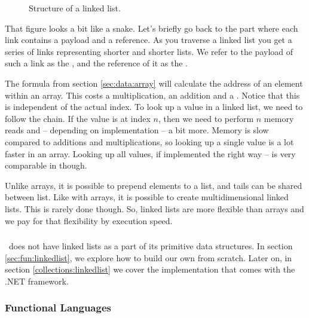\begin{figure}[tbp]
  
  \caption{Structure of a linked list.}
  \label{fig:primdata:linkedlist}
\end{figure}

That figure looks a bit like a snake. Let's briefly go back to the part where each link contains a payload and a reference. As you traverse a linked list you get a series of links representing shorter and shorter lists. We refer to the payload of such a link as the , and the reference of it as the .

The formula from section \ref{sec:data:array} will calculate the address of an element within an array. This costs a multiplication, an addition and a . Notice that this is independent of the actual index. To look up a value in a linked list, we need to follow the chain. If the value is at index $n$, then we need to perform $n$ memory reads and -- depending on implementation -- a bit more. Memory is slow compared to additions and multiplications, so looking up a single value is a lot faster in an array. Looking up all values, if implemented the right way -- is very comparable in  though.

Unlike arrays, it is possible to prepend elements to a list, and tails can be shared between list. Like with arrays, it is possible to create multidimensional linked lists. This is rarely done though. So, linked lists are more flexible than arrays and we pay for that flexibility by  execution speed.

\subsubsection{\csharp}

\csharp\ does not have linked lists as a part of its primitive data structures. In section \ref{sec:fun:linkedlist}, we explore how to build our own from scratch. Later on, in section \ref{collections:linkedlist} we cover the implementation that comes with the .NET framework.

\subsubsection{Functional Languages}

